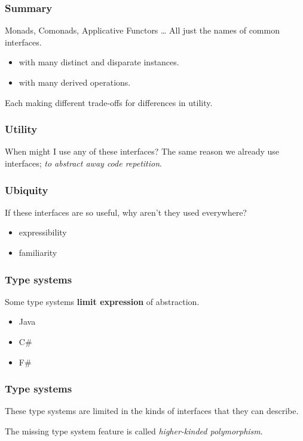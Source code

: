 \begin{frame}
\frametitle{Summary}
\begin{block}{Monads, Comonads, Applicative Functors \ldots}
All just the names of common interfaces.
\begin{itemize}
\item with many distinct and disparate instances.
\item with many derived operations.
\end{itemize}
Each making different trade-offs for differences in utility.
\end{block}
\end{frame}

\begin{frame}
\frametitle{Utility}
\begin{block}{When might I use any of these interfaces?}
The same reason we already use interfaces; \emph{to abstract away code repetition}.
\end{block}
\end{frame}

\begin{frame}
\frametitle{Ubiquity}
\begin{block}{If these interfaces are so useful, why aren't they used everywhere?}
\begin{itemize}
\item expressibility
\item familiarity
\end{itemize}
\end{block}
\end{frame}

\begin{frame}
\frametitle{Type systems}
\begin{block}{Some type systems \textbf{limit expression} of abstraction.}
\begin{itemize}
\item Java
\item C\#
\item F\#
\end{itemize}
\end{block}
\end{frame}

\begin{frame}
\frametitle{Type systems}
\begin{center}
These type systems are limited in the kinds of interfaces that they can describe.
\end{center}
\begin{center}
The missing type system feature is called \emph{higher-kinded polymorphism}.
\end{center}
\end{frame}

